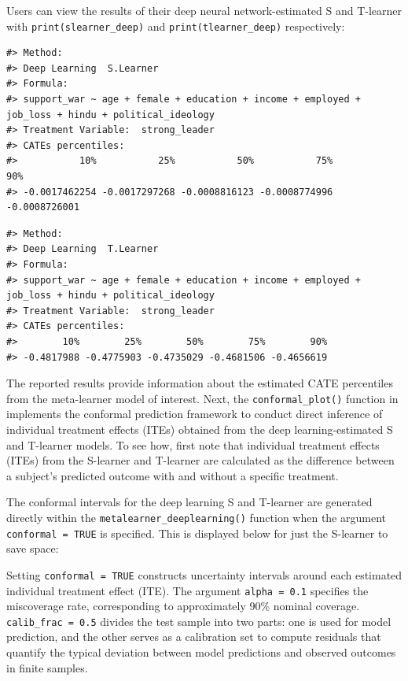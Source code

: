 Users can view the results of their deep neural network-estimated S and
T-learner with \texttt{print(slearner\_deep)} and \texttt{print(tlearner\_deep)}
respectively:

\begin{verbatim}
#> Method:
#> Deep Learning  S.Learner
#> Formula:
#> support_war ~ age + female + education + income + employed +      job_loss + hindu + political_ideology
#> Treatment Variable:  strong_leader
#> CATEs percentiles:
#>           10%           25%           50%           75%           90% 
#> -0.0017462254 -0.0017297268 -0.0008816123 -0.0008774996 -0.0008726001
\end{verbatim}

\begin{verbatim}
#> Method:
#> Deep Learning  T.Learner
#> Formula:
#> support_war ~ age + female + education + income + employed +      job_loss + hindu + political_ideology
#> Treatment Variable:  strong_leader
#> CATEs percentiles:
#>        10%        25%        50%        75%        90% 
#> -0.4817988 -0.4775903 -0.4735029 -0.4681506 -0.4656619
\end{verbatim}

The reported results provide information about the estimated CATE
percentiles from the meta-learner model of interest. Next, the
\texttt{conformal\_plot()} function in  implements the
conformal prediction framework to conduct direct inference of individual
treatment effects (ITEs) obtained from the deep learning-estimated S and
T-learner models. To see how, first note that individual treatment
effects (ITEs) from the S-learner and T-learner are calculated as the
difference between a subject's predicted outcome with and without a
specific treatment.

The conformal intervals for the deep learning S and T-learner are
generated directly within the \texttt{metalearner\_deeplearning()} function when
the argument \texttt{conformal\ =\ TRUE} is specified. This is displayed below
for just the S-learner to save space:

Setting \texttt{conformal\ =\ TRUE} constructs uncertainty intervals around each
estimated individual treatment effect (ITE). The argument \texttt{alpha\ =\ 0.1}
specifies the miscoverage rate, corresponding to approximately 90\%
nominal coverage. \texttt{calib\_frac\ =\ 0.5} divides the test sample into two
parts: one is used for model prediction, and the other serves as a
calibration set to compute residuals that quantify the typical deviation
between model predictions and observed outcomes in finite samples.

